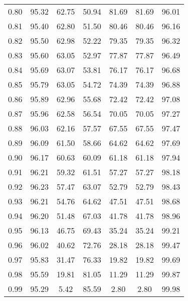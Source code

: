 \begin{tabular}{|c|c|c|c|c|c|c|}
      0.80 &     95.32 &     62.75 &      50.94 &   81.69 &      81.69 &         96.01 \\
      0.81 &     95.40 &     62.80 &      51.50 &   80.46 &      80.46 &         96.16 \\
      0.82 &     95.50 &     62.98 &      52.22 &   79.35 &      79.35 &         96.32 \\
      0.83 &     95.60 &     63.05 &      52.97 &   77.87 &      77.87 &         96.49 \\
      0.84 &     95.69 &     63.07 &      53.81 &   76.17 &      76.17 &         96.68 \\
      0.85 &     95.79 &     63.05 &      54.72 &   74.39 &      74.39 &         96.88 \\
      0.86 &     95.89 &     62.96 &      55.68 &   72.42 &      72.42 &         97.08 \\
      0.87 &     95.96 &     62.58 &      56.54 &   70.05 &      70.05 &         97.27 \\
      0.88 &     96.03 &     62.16 &      57.57 &   67.55 &      67.55 &         97.47 \\
      0.89 &     96.09 &     61.50 &      58.66 &   64.62 &      64.62 &         97.69 \\
      0.90 &     96.17 &     60.63 &      60.09 &   61.18 &      61.18 &         97.94 \\
      0.91 &     96.21 &     59.32 &      61.51 &   57.27 &      57.27 &         98.18 \\
      0.92 &     96.23 &     57.47 &      63.07 &   52.79 &      52.79 &         98.43 \\
      0.93 &     96.21 &     54.76 &      64.62 &   47.51 &      47.51 &         98.68 \\
      0.94 &     96.20 &     51.48 &      67.03 &   41.78 &      41.78 &         98.96 \\
      0.95 &     96.13 &     46.75 &      69.43 &   35.24 &      35.24 &         99.21 \\
      0.96 &     96.02 &     40.62 &      72.76 &   28.18 &      28.18 &         99.47 \\
      0.97 &     95.83 &     31.47 &      76.33 &   19.82 &      19.82 &         99.69 \\
      0.98 &     95.59 &     19.81 &      81.05 &   11.29 &      11.29 &         99.87 \\
      0.99 &     95.29 &      5.42 &      85.59 &    2.80 &       2.80 &         99.98 \\
\bottomrule
\end{tabular}
